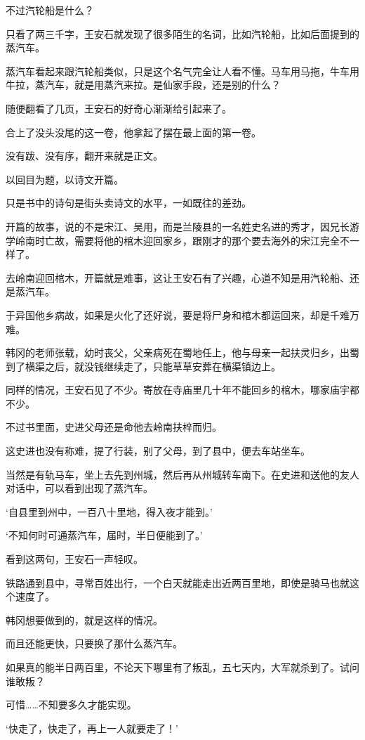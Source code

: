 不过汽轮船是什么？

只看了两三千字，王安石就发现了很多陌生的名词，比如汽轮船，比如后面提到的蒸汽车。

蒸汽车看起来跟汽轮船类似，只是这个名气完全让人看不懂。马车用马拖，牛车用牛拉，蒸汽车，就是用蒸汽来拉。是仙家手段，还是别的什么？

随便翻看了几页，王安石的好奇心渐渐给引起来了。

合上了没头没尾的这一卷，他拿起了摆在最上面的第一卷。

没有跋、没有序，翻开来就是正文。

以回目为题，以诗文开篇。

只是书中的诗句是街头卖诗文的水平，一如既往的差劲。

开篇的故事，说的不是宋江、吴用，而是兰陵县的一名姓史名进的秀才，因兄长游学岭南时亡故，需要将他的棺木迎回家乡，跟刚才的那个要去海外的宋江完全不一样了。

去岭南迎回棺木，开篇就是难事，这让王安石有了兴趣，心道不知是用汽轮船、还是蒸汽车。

于异国他乡病故，如果是火化了还好说，要是将尸身和棺木都运回来，却是千难万难。

韩冈的老师张载，幼时丧父，父亲病死在蜀地任上，他与母亲一起扶灵归乡，出蜀到了横渠之后，就没钱继续走了，只能草草安葬在横渠镇边上。

同样的情况，王安石见了不少。寄放在寺庙里几十年不能回乡的棺木，哪家庙宇都不少。

不过书里面，史进父母还是命他去岭南扶梓而归。

这史进也没有称难，提了行装，别了父母，到了县中，便去车站坐车。

当然是有轨马车，坐上去先到州城，然后再从州城转车南下。在史进和送他的友人对话中，可以看到出现了蒸汽车。

‘自县里到州中，一百八十里地，得入夜才能到。’

‘不知何时可通蒸汽车，届时，半日便能到了。’

看到这两句，王安石一声轻叹。

铁路通到县中，寻常百姓出行，一个白天就能走出近两百里地，即使是骑马也就这个速度了。

韩冈想要做到的，就是这样的情况。

而且还能更快，只要换了那什么蒸汽车。

如果真的能半日两百里，不论天下哪里有了叛乱，五七天内，大军就杀到了。试问谁敢叛？

可惜……不知要多久才能实现。

‘快走了，快走了，再上一人就要走了！’


